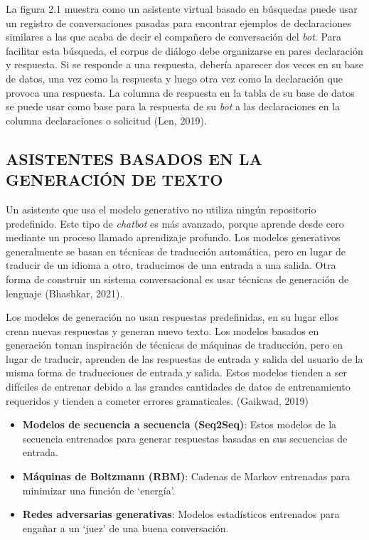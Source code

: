 \documentclass[letter, openright, 12pt]{book}
\begin{document}
La figura 2.1 muestra como un asistente virtual basado en búsquedas puede usar un registro de conversaciones pasadas para encontrar ejemplos de declaraciones similares a las que acaba de decir el compañero de conversación del \textit{bot}. Para facilitar esta búsqueda, el corpus de diálogo debe organizarse en pares declaración y respuesta. Si se responde a una respuesta, debería aparecer dos veces en su base de datos, una vez como la respuesta y luego otra vez como la declaración que provoca una respuesta. La columna de respuesta en la tabla de su base de datos se puede usar como base para la respuesta de su \textit{bot} a las declaraciones en la columna declaraciones o solicitud (Len, 2019).

\subsection{ASISTENTES BASADOS EN LA GENERACIÓN DE TEXTO}
Un asistente que usa el modelo generativo no utiliza ningún repositorio predefinido. Este tipo de \textit{chatbot} es más avanzado, porque aprende desde cero mediante un proceso llamado aprendizaje profundo. Los modelos generativos generalmente se basan en técnicas de traducción automática, pero en lugar de traducir de un idioma a otro, traducimos de una entrada a una salida. Otra forma de construir un sistema conversacional es usar técnicas de generación de lenguaje (Bhashkar, 2021).\par 
Los modelos de generación no usan respuestas predefinidas, en su lugar ellos crean nuevas respuestas y generan nuevo texto. Los modelos basados en generación toman inspiración de técnicas de máquinas de traducción, pero en lugar de traducir, aprenden de las respuestas de entrada y salida del usuario de la misma forma de traducciones de entrada y salida. Estos modelos tienden a ser difíciles de entrenar debido a las grandes cantidades de datos de entrenamiento requeridos y tienden a cometer errores gramaticales. (Gaikwad, 2019)

\begin{itemize}
\item \textbf{Modelos de secuencia a secuencia (Seq2Seq)}: Estos modelos de la secuencia entrenados para generar respuestas basadas en sus secuencias de entrada.
\item \textbf{Máquinas de Boltzmann (RBM)}: Cadenas de Markov entrenadas para minimizar una función de ‘energía’.
\item \textbf{Redes adversarias generativas}: Modelos estadísticos entrenados para engañar a un ‘juez’ de una buena conversación.
\end{itemize}
\end{document}
